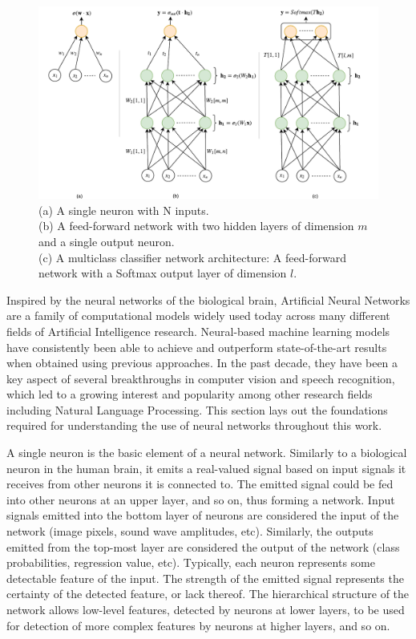 \begin{figure}[htbp]
  \centering
    \includegraphics[width=1\textwidth]{Figures/neurons.pdf}
  \caption{ 
    (a) A single neuron with N inputs. \\
    (b) A feed-forward network with two hidden layers of dimension $m$ and a single output neuron. \\
    (c) A multiclass classifier network architecture: A feed-forward network with a Softmax output layer of dimension $l$.}
  \label{fig:networks}
\end{figure}

Inspired by the neural networks of the biological brain, Artificial Neural Networks are a family of computational models widely used today across many different fields of Artificial Intelligence research. Neural-based machine learning models have consistently been able to achieve and outperform state-of-the-art results when obtained using previous approaches. In the past decade, they have been a key aspect of several breakthroughs in computer vision and speech recognition, which led to a growing interest and popularity among other research fields including Natural Language Processing. This section lays out the foundations required for understanding the use of neural networks throughout this work.

\medskip

A single neuron is the basic element of a neural network. Similarly to a biological neuron in the human brain, it emits a real-valued signal based on input signals it receives from other neurons it is connected to. The emitted signal could be fed into other neurons at an upper layer, and so on, thus forming a network. Input signals emitted into the bottom layer of neurons are considered the input of the network (image pixels, sound wave amplitudes, etc). Similarly, the outputs emitted from the top-most layer are considered the output of the network (class probabilities, regression value, etc). Typically, each neuron represents some detectable feature of the input. The strength of the emitted signal represents the certainty of the detected feature, or lack thereof. The hierarchical structure of the network allows low-level features, detected by neurons at lower layers, to be used for detection of more complex features by neurons at higher layers, and so on.

